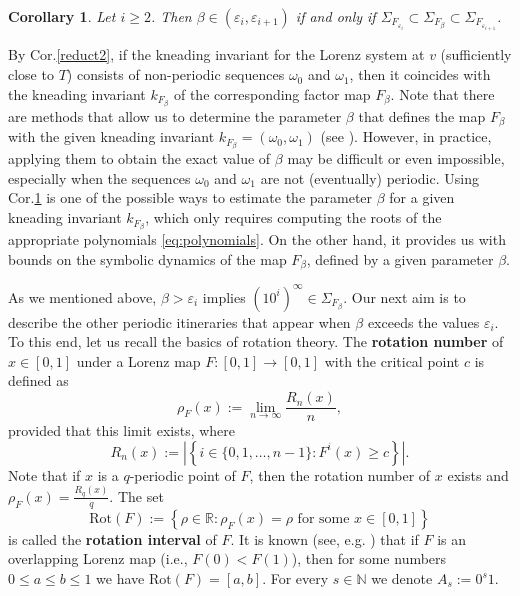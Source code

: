 \documentclass[10pt,reqno]{amsart}
\theoremstyle{plain}
\theoremstyle{assumption}
\theoremstyle{notation}
\theoremstyle{claim}
\theoremstyle{conj}
\theoremstyle{theorem}
\theoremstyle{proposition}
\theoremstyle{corollary}
\newtheorem{corollary}{Corollary}[section]
\begin{document}
\begin{corollary}
\label{cor:kneading_iff}
    Let $i\geq2$. Then $\beta\in(\varepsilon_i,\varepsilon_{i+1})$ if and only if $\Sigma_{F_{\varepsilon_i}}\subset\Sigma_{F_{\beta}}\subset\Sigma_{F_{\varepsilon_{i+1}}}$. 
\end{corollary}

By Cor.\ref{reduct2}, if the kneading invariant for the Lorenz system at $v$ (sufficiently close to $T$) consists of non-periodic sequences $\omega_0$ and $\omega_1$, then it coincides with the kneading invariant $k_{F_{\beta}}$ of the corresponding factor map $F_{\beta}$. Note that there are methods that allow us to determine the parameter $\beta$ that defines the map $F_{\beta}$ with the given kneading invariant $k_{F_{\beta}}=(\omega_0,\omega_1)$ (see \cite{BarSV,DinSun}). However, in practice, applying them to obtain the exact value of $\beta$ may be difficult or even impossible, especially when the sequences $\omega_0$ and $\omega_1$ are not (eventually) periodic. Using Cor.\ref{cor:kneading_iff} is one of the possible ways to estimate the parameter $\beta$ for a given kneading invariant $k_{F_{\beta}}$, which only requires computing the roots of the appropriate polynomials \eqref{eq:polynomials}. On the other hand, it provides us with bounds on the symbolic dynamics of the map $F_{\beta}$, defined by a given parameter $\beta$. 

As we mentioned above, $\beta>\varepsilon_i$ implies $(10^i)^\infty\in\Sigma_{F_{\beta}}$. Our next aim is to describe the other periodic itineraries that appear when $\beta$ exceeds the values $\varepsilon_i$. To this end, let us recall the basics of rotation theory. The \textbf{rotation number} of $x\in[0,1]$ under a Lorenz map $F\colon[0,1]\to[0,1]$ with the critical point $c$ is defined as
$$
\rho_F(x):=\lim\limits_{n\to\infty}\frac{R_n(x)}{n},
$$
provided that this limit exists, where
$$
R_n(x):=\left| \left\{i\in\{0,1,\dots,n-1\}:F^i(x)\geq c\right\}\right|.
$$
Note that if $x$ is a $q$-periodic point of $F$, then the rotation number of $x$ exists and $\rho_F(x)=\frac{R_q(x)}{q}$. The set
$$
\text{Rot}(F):=\left\{\rho\in\mathbb{R}:\rho_F(x)=\rho\text{ for some }x\in[0,1]\right\}
$$
is called the \textbf{rotation interval} of $F$. It is known (see, e.g. \cite{Alseda,MiGel}) that if $F$ is an overlapping Lorenz map (i.e., $F(0)< F(1)$), then for some numbers $0\leq a\leq b\leq1$ we have $\text{Rot}(F)=[a,b]$. For every $s\in\mathbb{N}$ we denote $A_s:=0^s1$.
\end{document}
